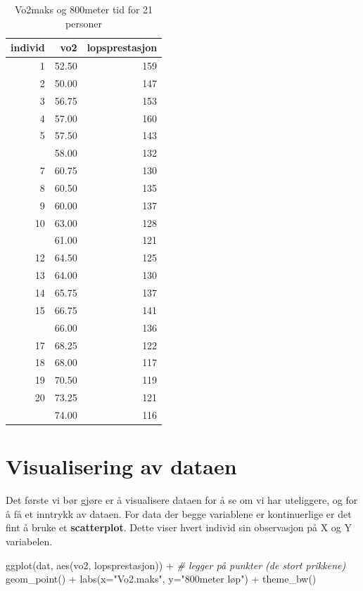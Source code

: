 \documentclass[
]{book}
\newenvironment{Shaded}{\begin{snugshade}}{\end{snugshade}}
\newcommand{\AttributeTok}[1]{\textcolor[rgb]{0.77,0.63,0.00}{#1}}
\newcommand{\CommentTok}[1]{\textcolor[rgb]{0.56,0.35,0.01}{\textit{#1}}}
\newcommand{\FunctionTok}[1]{\textcolor[rgb]{0.00,0.00,0.00}{#1}}
\newcommand{\NormalTok}[1]{#1}
\newcommand{\SpecialCharTok}[1]{\textcolor[rgb]{0.00,0.00,0.00}{#1}}
\newcommand{\StringTok}[1]{\textcolor[rgb]{0.31,0.60,0.02}{#1}}
\begin{document}
\begin{table}

\caption{\label{tab:unnamed-chunk-3}Vo2maks og 800meter tid for 21 personer}
\centering
\begin{tabular}[t]{rrr}
\toprule
individ & vo2 & lopsprestasjon\\
\midrule
1 & 52.50 & 159\\
2 & 50.00 & 147\\
3 & 56.75 & 153\\
4 & 57.00 & 160\\
5 & 57.50 & 143\\
\addlinespace
6 & 58.00 & 132\\
7 & 60.75 & 130\\
8 & 60.50 & 135\\
9 & 60.00 & 137\\
10 & 63.00 & 128\\
\addlinespace
11 & 61.00 & 121\\
12 & 64.50 & 125\\
13 & 64.00 & 130\\
14 & 65.75 & 137\\
15 & 66.75 & 141\\
\addlinespace
16 & 66.00 & 136\\
17 & 68.25 & 122\\
18 & 68.00 & 117\\
19 & 70.50 & 119\\
20 & 73.25 & 121\\
\addlinespace
21 & 74.00 & 116\\
\bottomrule
\end{tabular}
\end{table}

\hypertarget{visualisering-av-dataen}{%
\section{Visualisering av dataen}\label{visualisering-av-dataen}}

Det første vi bør gjøre er å visualisere dataen for å se om vi har uteliggere, og for å få et inntrykk av dataen. For data der begge variablene er kontinuerlige er det fint å bruke et \textbf{scatterplot}. Dette viser hvert individ sin observasjon på X og Y variabelen.

\begin{Shaded}
\begin{Highlighting}[]
\FunctionTok{ggplot}\NormalTok{(dat, }\FunctionTok{aes}\NormalTok{(vo2, lopsprestasjon)) }\SpecialCharTok{+}
  \CommentTok{\# legger på punkter (de stort prikkene)}
  \FunctionTok{geom\_point}\NormalTok{() }\SpecialCharTok{+}
  \FunctionTok{labs}\NormalTok{(}\AttributeTok{x=}\StringTok{"Vo2.maks"}\NormalTok{, }\AttributeTok{y=}\StringTok{"800meter løp"}\NormalTok{) }\SpecialCharTok{+}
  \FunctionTok{theme\_bw}\NormalTok{()}
\end{Highlighting}
\end{Shaded}
\end{document}
